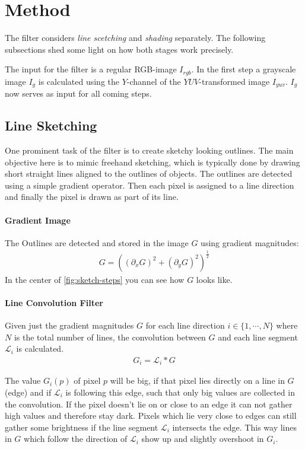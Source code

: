 \section{Method} \label{method}
The filter considers \textit{line scetching} and \textit{shading} separately.
The following subsections shed some light on how both stages work precisely.

The input for the filter is a regular RGB-image $I_{rgb}$. In the first step a
grayscale image $I_g$ is calculated using the $Y$-channel of the
$YUV$-transformed image $I_{yuv}$. $I_g$ now serves as input for all coming
steps.

\subsection{Line Sketching}
One prominent task of the filter is to create sketchy looking outlines. The main
objective here is to mimic freehand sketching, which is typically done by
drawing short straight lines aligned to the outlines of objects. The outlines
are detected using a simple gradient operator. Then each pixel is assigned to a
line direction and finally the pixel is drawn as part of its line.

\paragraph{Gradient Image}
The Outlines are detected and stored in the image $G$ using gradient magnitudes:
\begin{align*}
  G = ((\partial_x G)^2 + (\partial_y G)^2)^{\frac{1}{2}}
\end{align*}
In the center of \autoref{fig:sketch-steps} you can see how $G$ looks like.

\paragraph{Line Convolution Filter}
Given just the gradient magnitudes $G$ for each line direction $i \in
\lbrace 1,\cdots,N\rbrace$ where $N$ is the total number of lines, the convolution between
$G$ and each line segment $\mathscr{L}_i$ is calculated.
\begin{align}
  G_i = \mathscr{L}_i * G
  \label{eq:Gi}
\end{align}

The value $G_i(p)$ of pixel $p$ will be big, if that pixel lies directly on
a line in $G$ (edge) and if $\mathscr{L}_i$ is following this edge, such that only big
values are collected in the convolution. If the pixel doesn't lie on or close to
an edge it can not gather high values and therefore stay dark. Pixels which lie
very close to edges can still gather some brightness if the
line segment $\mathscr{L}_i$ intersects the edge. This way lines in $G$ which
follow the direction of $\mathscr{L}_i$ show up and slightly overshoot in $G_i$.

